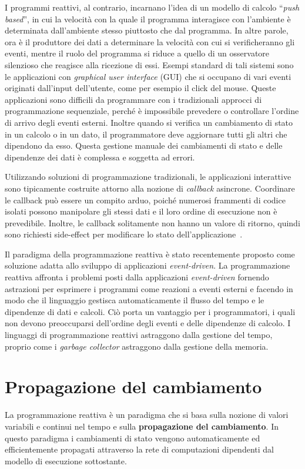 \documentclass[12pt,a4paper,openright,twoside]{book}
\begin{document}
I programmi reattivi, al contrario, incarnano l'idea di un modello di calcolo ``\textit{push based}'', in cui la velocità con la quale il programma interagisce con l'ambiente è determinata dall'ambiente stesso piuttosto che dal programma. In altre parole, ora è il produttore dei dati a determinare la velocità con cui si verificheranno gli eventi, mentre il ruolo del programma si riduce a quello di un osservatore silenzioso che reagisce alla ricezione di essi. Esempi standard di tali sistemi sono le applicazioni con \textit{graphical user interface} (GUI) che si occupano di vari eventi originati dall'input dell'utente, come per esempio il click del mouse. Queste applicazioni sono difficili da programmare con i tradizionali approcci di programmazione sequenziale, perché è impossibile prevedere o controllare l'ordine di arrivo degli eventi esterni. Inoltre quando si verifica un cambiamento di stato in un calcolo o in un dato, il programmatore deve aggiornare tutti gli altri che dipendono da esso. Questa gestione manuale dei cambiamenti di stato e delle dipendenze dei dati è complessa e soggetta ad errori.

Utilizzando soluzioni di programmazione tradizionali, le applicazioni interattive sono tipicamente costruite attorno alla nozione di \textit{callback} asincrone. 
Coordinare le callback può essere un compito arduo, poiché numerosi frammenti di codice isolati possono manipolare gli stessi dati e il loro ordine di esecuzione non è prevedibile. Inoltre, le callback solitamente non hanno un valore di ritorno, quindi sono richiesti side-effect per modificare lo stato dell'applicazione~\cite{DBLP:phd/us/Cooper08}. 

Il paradigma della programmazione reattiva è stato recentemente proposto come soluzione adatta allo sviluppo di applicazioni \textit{event-driven}. La programmazione reattiva affronta i problemi posti dalla applicazioni \textit{event-driven} fornendo astrazioni per esprimere i programmi come reazioni a eventi esterni e facendo in modo che il linguaggio gestisca automaticamente il flusso del tempo e le dipendenze di dati e calcoli. Ciò porta un vantaggio per i programmatori, i quali non devono preoccuparsi dell'ordine degli eventi e delle dipendenze di calcolo. I linguaggi di programmazione reattivi astraggono dalla gestione del tempo, proprio come i \textit{garbage collector} astraggono dalla gestione della memoria. 

\section{Propagazione del cambiamento}
La programmazione reattiva è un paradigma che si basa sulla nozione di valori variabili e continui nel tempo e sulla \textbf{propagazione del cambiamento}. 
In questo paradigma i cambiamenti di stato vengono automaticamente ed efficientemente propagati attraverso la rete di computazioni dipendenti dal modello di esecuzione sottostante.
\end{document}
